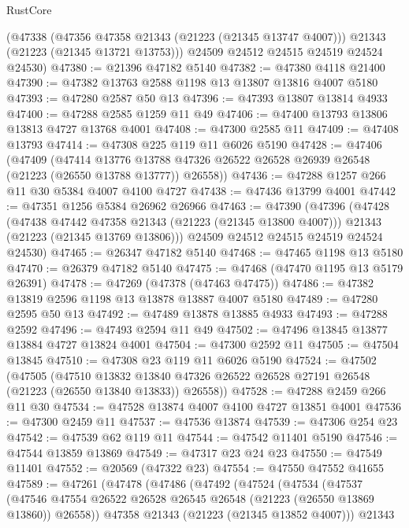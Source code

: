 \begin{lexlean}{RustCore}
\begin{coremodule}
      (@47338
        (@47356 @47358 @21343 (@21223 (@21345 @13747 @4007)))
        @21343
        (@21223 (@21345 @13721 @13753)))
      @24509
      @24512
      @24515
      @24519
      @24524
      @24530)
@47380 := @21396 @47182 @5140
@47382 := @47380 @4118 @21400
@47390 := @47382 @13763 @2588 @1198 @13 @13807 @13816 @4007 @5180
@47393 := @47280 @2587 @50 @13
@47396 := @47393 @13807 @13814 @4933
@47400 := @47288 @2585 @1259 @11 @49
@47406 := @47400 @13793 @13806 @13813 @4727 @13768 @4001
@47408 := @47300 @2585 @11
@47409 := @47408 @13793
@47414 := @47308 @225 @119 @11 @6026 @5190
@47428 := @47406
    (@47409
      (@47414
        @13776
        @13788
        @47326
        @26522
        @26528
        @26939
        @26548
        (@21223 (@26550 @13788 @13777))
        @26558))
@47436 := @47288 @1257 @266 @11 @30 @5384 @4007 @4100 @4727
@47438 := @47436 @13799 @4001
@47442 := @47351 @1256 @5384 @26962 @26966
@47463 := @47390
    (@47396
      (@47428
        (@47438 @47442 @47358 @21343 (@21223 (@21345 @13800 @4007)))
        @21343
        (@21223 (@21345 @13769 @13806)))
      @24509
      @24512
      @24515
      @24519
      @24524
      @24530)
@47465 := @26347 @47182 @5140
@47468 := @47465 @1198 @13 @5180
@47470 := @26379 @47182 @5140
@47475 := @47468 (@47470 @1195 @13 @5179 @26391)
@47478 := @47269 (@47378 (@47463 @47475))
@47486 := @47382 @13819 @2596 @1198 @13 @13878 @13887 @4007 @5180
@47489 := @47280 @2595 @50 @13
@47492 := @47489 @13878 @13885 @4933
@47493 := @47288 @2592
@47496 := @47493 @2594 @11 @49
@47502 := @47496 @13845 @13877 @13884 @4727 @13824 @4001
@47504 := @47300 @2592 @11
@47505 := @47504 @13845
@47510 := @47308 @23 @119 @11 @6026 @5190
@47524 := @47502
    (@47505
      (@47510
        @13832
        @13840
        @47326
        @26522
        @26528
        @27191
        @26548
        (@21223 (@26550 @13840 @13833))
        @26558))
@47528 := @47288 @2459 @266 @11 @30
@47534 := @47528 @13874 @4007 @4100 @4727 @13851 @4001
@47536 := @47300 @2459 @11
@47537 := @47536 @13874
@47539 := @47306 @254 @23
@47542 := @47539 @62 @119 @11
@47544 := @47542 @11401 @5190
@47546 := @47544 @13859 @13869
@47549 := @47317 @23 @24 @23
@47550 := @47549 @11401
@47552 := @20569 (@47322 @23)
@47554 := @47550 @47552 @41655
@47589 := @47261
    (@47478
      (@47486
        (@47492
          (@47524
            (@47534
              (@47537
                (@47546 @47554 @26522 @26528 @26545 @26548 (@21223 (@26550 @13869 @13860)) @26558))
              @47358
              @21343
              (@21223 (@21345 @13852 @4007)))
            @21343

\end{coremodule}
\end{lexlean}
